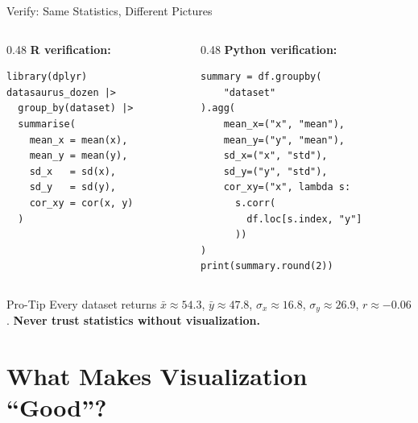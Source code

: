 \documentclass[10pt]{beamer}
\begin{document}
\begin{frame}[fragile]{Verify: Same Statistics, Different Pictures}
  \begin{columns}[T]
    \begin{column}{0.48\textwidth}
      \textbf{R verification:}
\begin{lstlisting}[style=rstyle]
library(dplyr)
datasaurus_dozen |>
  group_by(dataset) |>
  summarise(
    mean_x = mean(x),
    mean_y = mean(y),
    sd_x   = sd(x),
    sd_y   = sd(y),
    cor_xy = cor(x, y)
  )
\end{lstlisting}
    \end{column}
    \begin{column}{0.48\textwidth}
      \textbf{Python verification:}
\begin{lstlisting}[style=pythonstyle]
summary = df.groupby(
    "dataset"
).agg(
    mean_x=("x", "mean"),
    mean_y=("y", "mean"),
    sd_x=("x", "std"),
    sd_y=("y", "std"),
    cor_xy=("x", lambda s:
      s.corr(
        df.loc[s.index, "y"]
      ))
)
print(summary.round(2))
\end{lstlisting}
    \end{column}
  \end{columns}

  \vspace{4pt}
  \begin{alertblock}{Pro-Tip}
    Every dataset returns $\bar{x} \approx 54.3$, $\bar{y} \approx 47.8$,
    $\sigma_x \approx 16.8$, $\sigma_y \approx 26.9$, $r \approx -0.06$.
    \textbf{Never trust statistics without visualization.}
  \end{alertblock}
\end{frame}

\section{What Makes Visualization ``Good''?}
\end{document}
